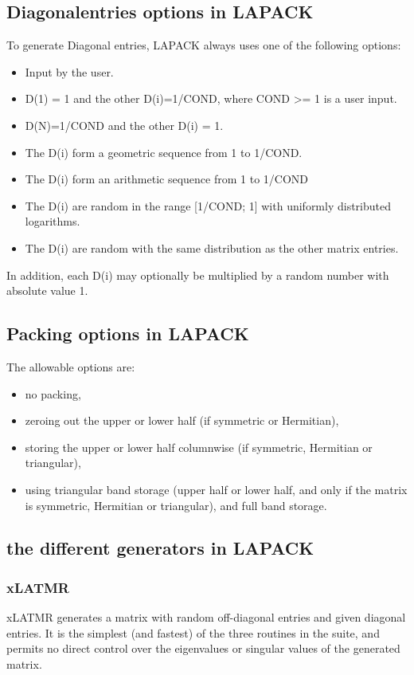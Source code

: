 \documentclass[a4paper]{article}
\begin{document}
\subsection{Diagonalentries options in LAPACK}
To generate Diagonal entries, LAPACK always uses one of the following options:
\begin{itemize}
	\item Input by the user.
	\item D(1) = 1 and the other D(i)=1/COND, where COND >= 1 is a user input.
	\item D(N)=1/COND and the other D(i) = 1. 
	\item The D(i) form a geometric sequence from 1 to 1/COND. 
	\item The D(i) form an arithmetic sequence from 1 to 1/COND
	\item The D(i) are random in the range [1/COND; 1] with uniformly distributed logarithms. 
	\item The D(i) are random with the same distribution as the other matrix entries.
\end{itemize}
In addition, each D(i) may optionally be multiplied by a random number with absolute value 1.

\subsection{Packing options in LAPACK}
The allowable options are: 
\begin{itemize}
\item no packing, 
\item zeroing out the upper or lower half (if symmetric or Hermitian), 
\item storing the upper or lower half columnwise (if symmetric, Hermitian or triangular), 
\item using triangular band storage (upper half or lower half, and only if the matrix is symmetric, Hermitian or triangular), and full band storage.
\end{itemize}

\subsection{the different generators in LAPACK}
\subsubsection{xLATMR}
xLATMR generates a matrix with random off-diagonal entries and given diagonal entries. It is the simplest (and fastest) of the three routines in the suite, and permits no direct control over the eigenvalues or singular values of the generated matrix.
\end{document}
